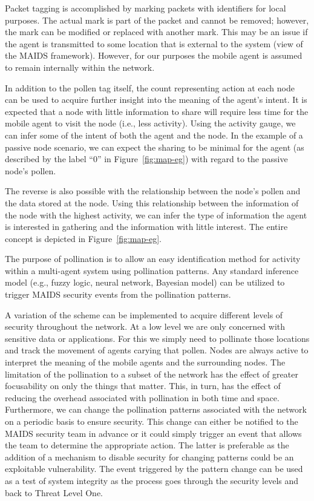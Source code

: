\documentclass{acm_proc_article-sp}
\begin{document}
Packet tagging is accomplished by marking packets with identifiers for local purposes.  The actual mark is part of the packet and cannot be removed; however, the mark can be modified or replaced with another mark.  This may be an issue if the agent is transmitted to some location that is external to the system (view of the MAIDS framework).  However, for our purposes the mobile agent is assumed to remain internally within the network.

In addition to the pollen tag itself, the count representing action at each node can be used to acquire further insight into the meaning of the agent's intent.  It is expected that a node with little information to share will require less time for the mobile agent to visit the node (i.e., less activity).  Using the activity gauge, we can infer some of the intent of both the agent and the node.  In the example of a passive node scenario, we can expect the sharing to be minimal for the agent (as described by the label ``0'' in Figure~\ref{fig:map-eg}) with regard to the passive node's pollen.

The reverse is also possible with the relationship between the node's pollen and the data stored at the node.  Using this relationship between the information of the node with the highest activity, we can infer the type of information the agent is interested in gathering and the information with little interest.  The entire concept is depicted in Figure~\ref{fig:map-eg}.

The purpose of pollination is to allow an easy identification method for activity within a multi-agent system using pollination patterns.  Any standard inference model (e.g., fuzzy logic, neural network, Bayesian model) can be utilized to trigger MAIDS security events from the pollination patterns.

A variation of the scheme can be implemented to acquire different levels of security throughout the network.  At a low level we are only concerned with sensitive data or applications.  For this we simply need to pollinate those locations and track the movement of agents carying that pollen.  Nodes are always active to interpret the meaning of the mobile agents and the surrounding nodes.  The limitation of the pollination to a subset of the network has the effect of greater focusability on only the things that matter.  This, in turn, has the effect of reducing the overhead associated with pollination in both time and space.  Furthermore, we can change the pollination patterns associated with the network on a periodic basis to ensure security.  This change can either be notified to the MAIDS security team in advance or it could simply trigger an event that allows the team to determine the appropriate action.  The latter is preferable as the addition of a mechanism to disable security for changing patterns could be an exploitable vulnerability.  The event triggered by the pattern change can be used as a test of system integrity as the process goes through the security levels and back to Threat Level One.
\end{document}
